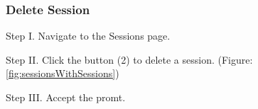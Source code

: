 \subsubsection{Delete Session}

\begin{userManualItemlist}
	\item[Step I.] Navigate to the Sessions page.
	\item[Step II.] Click the button (2) to delete a session. (Figure: \ref{fig:sessionsWithSessions})
	\item[Step III.] Accept the promt.
\end{userManualItemlist}
